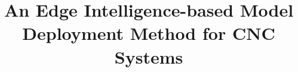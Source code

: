 \documentclass[preprint,12pt,authoryear]{elsarticle}
\begin{document}
\begin{frontmatter}



\title{An Edge Intelligence-based Model Deployment Method for CNC Systems}


\author{}



\end{frontmatter}
\end{document}

